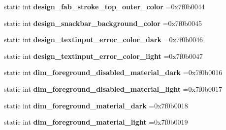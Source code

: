 \begin{DoxyCompactItemize}
static int {\bfseries design\+\_\+fab\+\_\+stroke\+\_\+top\+\_\+outer\+\_\+color} =0x7f0b0044
\item 
\mbox{\label{classandroid_1_1support_1_1design_1_1R_1_1color_a66ffaa196e69234c6204a8ea8f30de03}} 
static int {\bfseries design\+\_\+snackbar\+\_\+background\+\_\+color} =0x7f0b0045
\item 
\mbox{\label{classandroid_1_1support_1_1design_1_1R_1_1color_a160c67fbabe712d30f0cdd289e49983b}} 
static int {\bfseries design\+\_\+textinput\+\_\+error\+\_\+color\+\_\+dark} =0x7f0b0046
\item 
\mbox{\label{classandroid_1_1support_1_1design_1_1R_1_1color_ae433ef5c79e42bc83593c16e66d3fac9}} 
static int {\bfseries design\+\_\+textinput\+\_\+error\+\_\+color\+\_\+light} =0x7f0b0047
\item 
\mbox{\label{classandroid_1_1support_1_1design_1_1R_1_1color_a4f573acbae17d51fabf963fc88ce6dd3}} 
static int {\bfseries dim\+\_\+foreground\+\_\+disabled\+\_\+material\+\_\+dark} =0x7f0b0016
\item 
\mbox{\label{classandroid_1_1support_1_1design_1_1R_1_1color_a4d0cd4a53f409d4fd96309923d9b9dfd}} 
static int {\bfseries dim\+\_\+foreground\+\_\+disabled\+\_\+material\+\_\+light} =0x7f0b0017
\item 
\mbox{\label{classandroid_1_1support_1_1design_1_1R_1_1color_a47e01268e1a9b32aac48202452560b40}} 
static int {\bfseries dim\+\_\+foreground\+\_\+material\+\_\+dark} =0x7f0b0018
\item 
\mbox{\label{classandroid_1_1support_1_1design_1_1R_1_1color_aa2e8af853252e7050c29804834e241cb}} 
static int {\bfseries dim\+\_\+foreground\+\_\+material\+\_\+light} =0x7f0b0019
\item 
\mbox{\label{classandroid_1_1support_1_1design_1_1R_1_1color_a6c499bbefc5b59f26d33927171dfcc33}} 

\end{DoxyCompactItemize}
